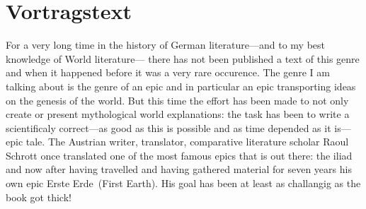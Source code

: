 \section{Vortragstext}
For a very long time in the history of German literature---and to my best
  knowledge of World literature--- there has not been published a text of
  this genre and when it happened before it was a very rare occurence.
The genre I am talking about is the genre of an epic and in particular
  an epic transporting ideas on the genesis of the world.
But this time the effort has been made to not only create or present
  mythological world explanations: the task has been to write a scientificaly
  correct---as good as this is possible and as time depended as it is---epic
  tale.
The Austrian writer, translator, comparative literature scholar Raoul Schrott
  once translated one of the most famous epics that is out there: the iliad
  and now after having travelled and having gathered material for seven years
  his own epic \glqq Erste Erde\grqq\ (First Earth).
His goal has been at least as challangig as the book got thick!
